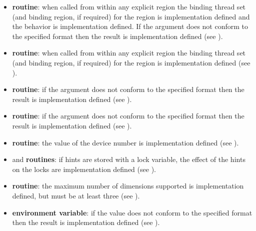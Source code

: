 \begin{itemize}
\item {} \textbf{routine}: when called from within any explicit 
 region the binding thread set (and binding region, if required) for the 
 region is implementation defined and the 
behavior is implementation defined. If the argument does not 
conform to the specified format then the result is implementation defined (see 
).  

\item {} \textbf{routine}: when called from within any explicit 
 region the binding thread set (and binding region, if required) for the 
 region is implementation defined (see 
).

\item {} \textbf{routine}:  if the argument does not 
conform to the specified format then the result is implementation defined (see 
).

\item {} \textbf{routine}:  if the  argument does not 
conform to the specified format then the result is implementation defined (see 
).

\item {} \textbf{routine}: the value of
  the device number is implementation defined (see ).

\item {} and  \textbf{routines}: 
if hints are stored with a lock variable, the effect of the hints on the locks are implementation defined 
(see ).

\item {} \textbf{routine}: 
  the maximum number of dimensions supported is implementation defined, but
  must be at least three (see ).

\item {} \textbf{environment variable}: if the value does not 
conform to the specified format then the result is implementation defined (see 
).


\end{itemize}

